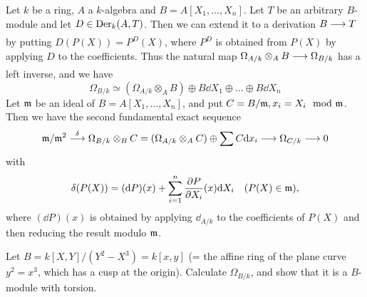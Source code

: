 \documentclass[../main]{subfiles}
\begin{document}
\begin{parexample}
    Let $k$ be a ring, $A$ a $k$-algebra and \newline $B=A[X_1,\dots, X_n]$. Let $T$ be an arbitrary $B$-module and let $D \in \operatorname{Der}_k(A, T)$. Then we can extend it to a derivation $B \varrightarrow{} T$ by putting $D(P(X))=P^D(X)$, where $P^D$ is obtained from $P(X)$ by applying $D$ to the coefficients. Thus the natural map \newline $\Omega_{A / k} \otimes_A B \varrightarrow{} \Omega_{B / k}$ has a left inverse, and we have \[\Omega_{B / k} \simeq(\Omega_{A / k} \otimes_A B) \oplus B\dd X_1 \oplus \dots \oplus B \dd X_n\] Let $\mathfrak{m}$ be an ideal of $B=A[X_1, \dots, X_n]$, and put $C=B / \ideal{m}, x_i=X_i \mod \ideal{m}$. Then we have the second fundamental exact sequence \[ \ideal{m}/ \ideal{m}^2 \varrightarrow{\delta} \Omega_{B / k} \otimes_B C=(\Omega_{A/k} \otimes_A C) \oplus \sum C\dd x_i \varrightarrow{} \Omega_{C / k} \varrightarrow{} 0\] with \[\delta(P(X))=(\dd P)(x)+\sum_{i=1}^n \pdv{P}{X_i}(x) \dd X_i \for{P(X) \in \ideal{m}},\] where $(\dd P)(x)$ is obtained by applying $\dd_{A / k}$ to the coefficients of $P(X)$ and then reducing the result modulo $\mathfrak{m}$.
\end{parexample}

\begin{exercise}\label{exe:26.04}
    Let $B=k[X, Y] /(Y^2-X^3)=k[x, y]$ (= the affine ring of the plane curve $y^2=x^3$, which has a cusp at the origin). Calculate $\Omega_{B/k}$, and show that it is a $B$-module with torsion.
\end{exercise}
\end{document}
